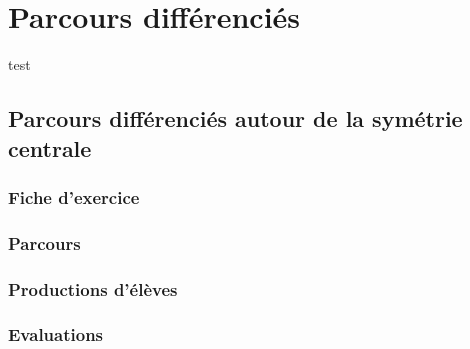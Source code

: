 \section{Parcours différenciés}
test
\subsection{Parcours différenciés autour de la symétrie centrale}
\subsubsection*{Fiche d'exercice}\label{parcours_symetrie_centrale}
\begin{figure}[!h]
\end{figure}
\subsubsection*{Parcours}
\subsubsection*{Productions d'élèves}
\subsubsection*{Evaluations}